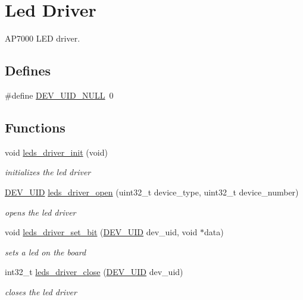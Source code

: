 \hypertarget{group___l_e_d___d_r_i_v_e_r}{
\section{Led Driver}
\label{group___l_e_d___d_r_i_v_e_r}
}
AP7000 LED driver.  


\subsection*{Defines}
\begin{CompactItemize}
\item 
\#define \hyperlink{group___l_e_d___d_r_i_v_e_r_gda38030928bc5c3bdec6b7613fd3cab9}{DEV\_\-UID\_\-NULL}~0
\end{CompactItemize}
\subsection*{Functions}
\begin{CompactItemize}
\item 
\hypertarget{group___l_e_d___d_r_i_v_e_r_g0465ca2d4ffd8bed426bd197898bf72b}{
void \hyperlink{group___l_e_d___d_r_i_v_e_r_g0465ca2d4ffd8bed426bd197898bf72b}{leds\_\-driver\_\-init} (void)}
\label{group___l_e_d___d_r_i_v_e_r_g0465ca2d4ffd8bed426bd197898bf72b}

\begin{CompactList}\small\item\em initializes the led driver \item\end{CompactList}\item 
\hyperlink{group___d_e_v_i_c_e___a_p_i_g9f427f7fc1dc07b788af60c2aaa6b8d3}{DEV\_\-UID} \hyperlink{group___l_e_d___d_r_i_v_e_r_gb7d8a66025cb15b1eee23f5612fec260}{leds\_\-driver\_\-open} (uint32\_\-t device\_\-type, uint32\_\-t device\_\-number)
\begin{CompactList}\small\item\em opens the led driver \item\end{CompactList}\item 
void \hyperlink{group___l_e_d___d_r_i_v_e_r_ge5f9451ef85692996d440cb67950645a}{leds\_\-driver\_\-set\_\-bit} (\hyperlink{group___d_e_v_i_c_e___a_p_i_g9f427f7fc1dc07b788af60c2aaa6b8d3}{DEV\_\-UID} dev\_\-uid, void $\ast$data)
\begin{CompactList}\small\item\em sets a led on the board \item\end{CompactList}\item 
int32\_\-t \hyperlink{group___l_e_d___d_r_i_v_e_r_g1c9941f649946c996f3b22a47d809f94}{leds\_\-driver\_\-close} (\hyperlink{group___d_e_v_i_c_e___a_p_i_g9f427f7fc1dc07b788af60c2aaa6b8d3}{DEV\_\-UID} dev\_\-uid)
\begin{CompactList}\small\item\em closes the led driver \item\end{CompactList}\end{CompactItemize}


